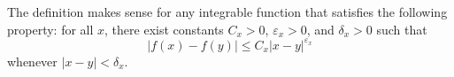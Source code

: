 \begin{rmk}
    The definition makes sense for any integrable function that satisfies the following property: for all $x$, there exist constants $C_x > 0$, $\varepsilon_x > 0$, and $\delta_x > 0$ such that
\[
|f(x) - f(y)| \leqslant C_x |x-y|^{\varepsilon_x}
\]
whenever $|x-y| < \delta_x$.
\end{rmk}
